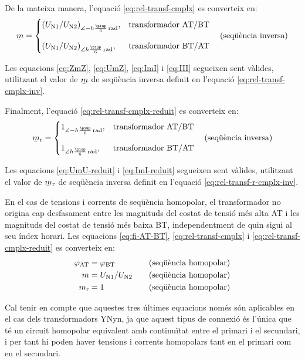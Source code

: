 De la mateixa manera, l'equació \eqref{eq:rel-transf-cmplx} es converteix en:
\begin{equation}\label{eq:rel-transf-cmplx-inv}
\cmplx{m} = \begin{cases}
     (U\ped{N1}/U\ped{N2})_{\angle -h \frac{\piup}{6}\si{\,rad}}, & \text{transformador AT/BT}\\[2.7ex]
     (U\ped{N1}/U\ped{N2})_{\angle h \frac{\piup}{6}\si{\,rad}}, & \text{transformador BT/AT}
\end{cases}
\text{\quad(seqüència inversa)}
\end{equation}

Les equacions \eqref{eq:ZmZ}, \eqref{eq:UmZ}, \eqref{eq:ImI} i \eqref{eq:III} segueixen sent vàlides, utilitzant el valor de $\cmplx{m}$ de seqüència inversa definit en l'equació \eqref{eq:rel-transf-cmplx-inv}.

Finalment, l'equació \eqref{eq:rel-transf-cmplx-reduit} es converteix en:
\begin{equation}\label{eq:rel-transf-r-cmplx-inv}
\cmplx{m}\ped{r}  = \begin{cases}
      1_{\angle -h\frac{\piup}{6}\si{\,rad}}, & \text{transformador AT/BT}\\[2.7ex]
      1_{\angle h\frac{\piup}{6}\si{\,rad}}, & \text{transformador BT/AT}
\end{cases}
\text{\quad(seqüència inversa)}
\end{equation}

Les equacions \eqref{eq:UmU-reduit} i \eqref{eq:ImI-reduit} segueixen sent vàlides, utilitzant el valor de $\cmplx{m}\ped{r}$ de seqüència inversa definit en l'equació \eqref{eq:rel-transf-r-cmplx-inv}.

En el cas de tensions i corrents de seqüència homopolar, el transformador no  origina cap desfasament entre les magnituds  del costat de tensió més alta AT i les magnituds del costat de tensió més baixa BT, independentment de quin sigui al seu índex horari. Les equacions \eqref{eq:fi-AT-BT}, \eqref{eq:rel-transf-cmplx} i \eqref{eq:rel-transf-cmplx-reduit} es converteix en:
\begin{alignat}{3}
  \varphi_\mathrm{AT} &= \varphi_\mathrm{BT} &&\quad\text{(seqüència homopolar)} \\
  m &= U_\mathrm{N1}/U_\mathrm{N2} &&\quad\text{(seqüència homopolar)}\label{eq:rel-transf-cmplx-hom} \\
  m_\mathrm{r} &= 1 &&\quad\text{(seqüència homopolar)}
\end{alignat}

Cal tenir en compte que aquestes tres últimes equacions  només són aplicables en el cas dels transformadors YNyn, ja que aquest tipus de connexió és l'única que té un circuit homopolar equivalent amb continuïtat entre el primari i el secundari, i per tant hi poden haver tensions i corrents homopolars tant en el primari com en el secundari.

